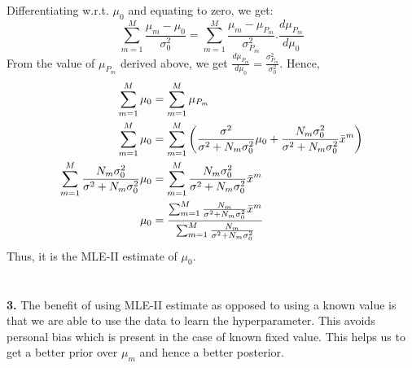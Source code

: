 \documentclass[a4paper,11pt]{article}
\begin{document}
\begin{pmisolution}
\noindent Differentiating w.r.t. $\mu_0$ and equating to zero, we get:
\begin{equation*}
    \sum_{m=1}^{M} \frac{\mu_m-\mu_0}{\sigma_0^2} = \sum_{m=1}^{M} \frac{\mu_m-\mu_{P_m}}{\sigma_{P_m}^2} .\frac{d\mu_{P_m}}{d\mu_0}
\end{equation*}
From the value of $\mu_{P_m}$ derived above, we get $\frac{d\mu_{P_m}}{d\mu_0} = \frac{\sigma_{P_m}^2}{\sigma_0^2}$. Hence,
\begin{equation*}
    \begin{split}
        \sum_{m=1}^{M} \mu_0 &= \sum_{m=1}^{M} \mu_{P_m} \\
        \sum_{m=1}^{M} \mu_0 &= \sum_{m=1}^{M} \left( \frac{\sigma^2}{\sigma^2 + N_m\sigma_0^2}\mu_0 + \frac{N_m\sigma_0^2}{\sigma^2 + N_m\sigma_0^2}\Bar{x}^m \right) \\
        \sum_{m=1}^{M} \frac{N_m\sigma_0^2}{\sigma^2 + N_m\sigma_0^2}\mu_0 &= \sum_{m=1}^{M} \frac{N_m\sigma_0^2}{\sigma^2 + N_m\sigma_0^2}\Bar{x}^m \\
        \mu_0 &= \frac{ \sum_{m=1}^{M} \frac{N_m}{\sigma^2 + N_m\sigma_0^2}\Bar{x}^m }{ \sum_{m=1}^{M} \frac{N_m}{\sigma^2 + N_m\sigma_0^2} }
    \end{split}
\end{equation*}
Thus, it is the MLE-II estimate of $\mu_0$.
\\ \\ \\
\textbf{3.} The benefit of using MLE-II estimate as opposed to using a known value is that we are able to use the data to learn the hyperparameter. This avoids personal bias which is present in the case of known fixed value. This helps us to get a better prior over $\mu_m$ and hence a better posterior. 

\end{pmisolution}
\end{document}
